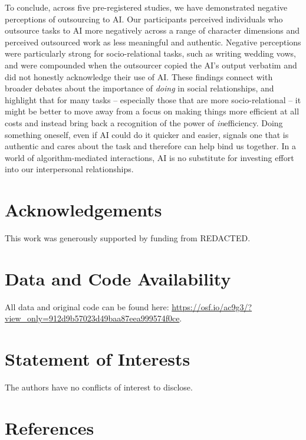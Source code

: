 \documentclass[
  man,
  floatsintext,
  longtable,
  nolmodern,
  notxfonts,
  notimes,
  colorlinks=true,linkcolor=blue,citecolor=blue,urlcolor=blue]{apa7}
\begin{document}
To conclude, across five pre-registered studies, we have demonstrated
negative perceptions of outsourcing to AI. Our participants perceived
individuals who outsource tasks to AI more negatively across a range of
character dimensions and perceived outsourced work as less meaningful
and authentic. Negative perceptions were particularly strong for
socio-relational tasks, such as writing wedding vows, and were
compounded when the outsourcer copied the AI's output verbatim and did
not honestly acknowledge their use of AI. These findings connect with
broader debates about the importance of \emph{doing} in social
relationships, and highlight that for many tasks -- especially those
that are more socio-relational -- it might be better to move away from a
focus on making things more efficient at all costs and instead bring
back a recognition of the power of \emph{in}efficiency. Doing something
oneself, even if AI could do it quicker and easier, signals one that is
authentic and cares about the task and therefore can help bind us
together. In a world of algorithm-mediated interactions, AI is no
substitute for investing effort into our interpersonal relationships.

\newpage
\nolinenumbers

\section*{Acknowledgements}\label{acknowledgements}

This work was generously supported by funding from REDACTED.

\section*{Data and Code Availability}\label{data-and-code-availability}

All data and original code can be found here:
\url{https://osf.io/ac9g3/?view_only=912d9b57023d49baa87eea999574f0ce}.

\section*{Statement of Interests}\label{statement-of-interests}

The authors have no conflicts of interest to disclose.

\newpage

\section*{References}\label{references}
\end{document}

